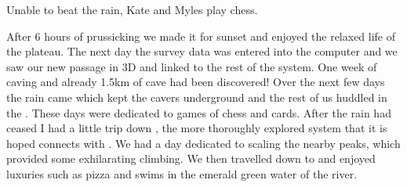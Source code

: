     \begin{marginfigure}
\checkoddpage \ifoddpage \forcerectofloat \else \forceversofloat \fi
\centering
 \caption{Unable to beat the rain, Kate and Myles play chess. }
 \label{chess game}
\end{marginfigure}

After 6 hours of prussicking we made it for sunset and enjoyed the relaxed life of the plateau. The
next day the survey data was entered into the computer and we saw our new passage in 3D and linked
to the rest of the system. One week of caving and already 1.5km of cave had been discovered! Over the
next few days the rain came which kept the cavers underground and the rest of us huddled in the . These days were dedicated to games of chess and cards. After the rain had ceased I had a little trip
down , the more thoroughly explored system that it is hoped connects with .
We had a day dedicated to scaling the nearby peaks, which provided some exhilarating climbing. We
then travelled down to  and enjoyed luxuries such as pizza and swims in the emerald green
water of the  river.


